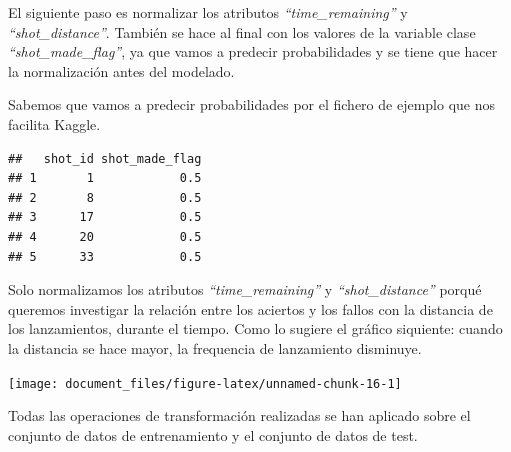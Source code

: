 \documentclass[
]{article}
\newenvironment{Shaded}{\begin{snugshade}}{\end{snugshade}}
\newcommand{\ControlFlowTok}[1]{\textcolor[rgb]{0.13,0.29,0.53}{\textbf{#1}}}
\newcommand{\KeywordTok}[1]{\textcolor[rgb]{0.13,0.29,0.53}{\textbf{#1}}}
\newcommand{\NormalTok}[1]{#1}
\newcommand{\OperatorTok}[1]{\textcolor[rgb]{0.81,0.36,0.00}{\textbf{#1}}}
\newcommand{\StringTok}[1]{\textcolor[rgb]{0.31,0.60,0.02}{#1}}
\begin{document}
El siguiente paso es normalizar los atributos \emph{``time\_remaining''}
y \emph{``shot\_distance''}. También se hace al final con los valores de
la variable clase \emph{``shot\_made\_flag''}, ya que vamos a predecir
probabilidades y se tiene que hacer la normalización antes del modelado.

Sabemos que vamos a predecir probabilidades por el fichero de ejemplo
que nos facilita Kaggle.

\begin{verbatim}
##   shot_id shot_made_flag
## 1       1            0.5
## 2       8            0.5
## 3      17            0.5
## 4      20            0.5
## 5      33            0.5
\end{verbatim}

\begin{Shaded}
\end{Shaded}

Solo normalizamos los atributos \emph{``time\_remaining''} y
\emph{``shot\_distance''} porqué queremos investigar la relación entre
los aciertos y los fallos con la distancia de los lanzamientos, durante
el tiempo. Como lo sugiere el gráfico siquiente: cuando la distancia se
hace mayor, la frequencia de lanzamiento disminuye.

\begin{center}\texttt{[image: document\_files/figure-latex/unnamed-chunk-16-1]} \end{center}

Todas las operaciones de transformación realizadas se han aplicado sobre
el conjunto de datos de entrenamiento y el conjunto de datos de test.
\end{document}
